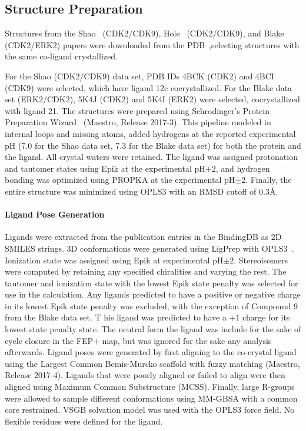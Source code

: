 \documentclass[phd,tocprelim]{cornell}
\begin{document}
\subsection{Structure Preparation}
Structures from the Shao~\citep{Shao2013-oe} (CDK2/CDK9), Hole~\citep{Hole2013-sr} (CDK2/CDK9), and Blake~\citep{Blake2016-su} (CDK2/ERK2) papers were downloaded from the PDB~\citep{Berman2002-hg},selecting structures with the same co-ligand crystallized. 

For the Shao (CDK2/CDK9) data set, PDB IDs 4BCK (CDK2) and 4BCI (CDK9) were selected, which have ligand 12c cocrystallized. 
For the Blake data set (ERK2/CDK2), 5K4J (CDK2) and 5K4I (ERK2) were selected, cocrystallized with ligand 21. 
The structures were prepared using Schrodinger’s Protein Preparation Wizard~\citep{Sastry2013-ax} (Maestro, Release 2017-3). 
This pipeline modeled in internal loops and missing atoms, added hydrogens at the reported experimental pH (7.0 for the Shao data set, 7.3 for the Blake data set) for both the protein and the ligand. 
All crystal waters were retained. 
The ligand was assigned protonation and tautomer states using Epik at the experimental pH$\pm2$, and hydrogen bonding was optimized using PROPKA at the experimental pH$\pm2$. 
Finally, the entire structure was minimized using OPLS3 with an RMSD cutoff of 0.3\AA.

\paragraph{Ligand Pose Generation}

Ligands were extracted from the publication entries in the BindingDB as 2D SMILES strings. 
3D conformations were generated using LigPrep with OPLS3~\citep{Harder:J.Chem.TheoryComput.:2016}. 
Ionization state was assigned using Epik at experimental pH$\pm2$. Stereoisomers were computed by retaining any specified chiralities and varying the rest. 
The tautomer and ionization state with the lowest Epik state penalty was selected for use in the calculation. 
Any ligands predicted to have a positive or negative charge in its lowest Epik state penalty was excluded, with the exception of Compound 9 from the Blake data set. T
his ligand was predicted to have a +1 charge for its lowest state penalty state. The neutral form the ligand was include for the sake of cycle closure in the FEP+ map, but was ignored for the sake any analysis afterwards. 
Ligand poses were generated by first aligning to the co-crystal ligand using the Largest Common Bemis-Murcko scaffold with fuzzy matching (Maestro, Release 2017-4). 
Ligands that were poorly aligned or failed to align were then aligned using Maximum Common Substructure (MCSS). 
Finally, large R-groups were allowed to sample different conformations using MM-GBSA with a common core restrained. VSGB solvation model was used with the OPLS3 force field. 
No flexible residues were defined for the ligand. 
\end{document}

